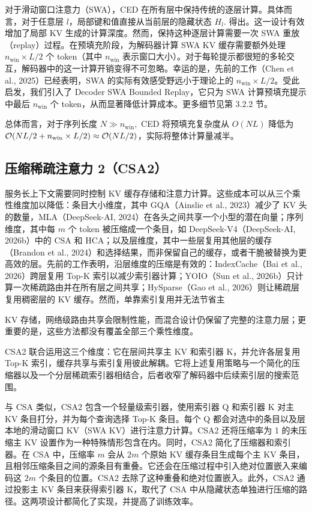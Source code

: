 \documentclass[
  10
]{article}
\begin{document}
对于滑动窗口注意力（SWA），CED 在所有层中保持传统的逐层计算。具体而言，对于任意层 $l$，局部键和值直接从当前层的隐藏状态 \(H _ { l } .\) 得出。这一设计有效增加了局部 KV 生成的计算深度。然而，保持这种逐层计算需要一次 SWA 重放（replay）过程。在预填充阶段，为解码器计算 SWA KV 缓存需要额外处理 \(n _ { \mathrm { w i n } } \times L / 2\) 个 token（其中 \(n _ { \mathrm { { w i n } } }\) 表示窗口大小）。对于每轮提示都很短的多轮交互，解码器中的这一计算开销变得不可忽略。幸运的是，先前的工作（Chen et al., 2025）已经表明，SWA 的实际有效感受野远小于理论上的 \(n _ { \mathrm { w i n } } \times L / 2\)。受此启发，我们引入了 Decoder SWA Bounded Replay，它只为 SWA 计算预填充提示中最后 \(n _ { \mathrm { w i n } }\) 个 token，从而显著降低计算成本。更多细节见第 3.2.2 节。

总体而言，对于序列长度 \(N \gg n _ { \mathrm { w i n } } ,\) CED 将预填充复杂度从 \(O ( N L )\) 降低为 \({ \cal O } ( N L / 2 + n _ { \mathrm { w i n } } \times L / 2 ) \approx { \cal O } ( N L / 2 )\)，实际将整体计算量减半。

\subsection{压缩稀疏注意力 2（CSA2）}\label{compressed-sparse-attention-2-csa2}

服务长上下文需要同时控制 KV 缓存存储和注意力计算。这些成本可以从三个乘性维度加以降低：条目大小维度，其中 GQA（Ainslie et al., 2023）减少了 KV 头的数量，MLA（DeepSeek-AI, 2024）在各头之间共享一个小型的潜在向量；序列维度，其中每 $m$ 个 token 被压缩成一个条目，如 DeepSeek-V4（DeepSeek-AI, 2026b）中的 CSA 和 HCA；以及层维度，其中一些层复用其他层的缓存（Brandon et al., 2024）和选择结果，而非保留自己的缓存，或者干脆被替换为更高效的层。先前的工作表明，沿层维度的压缩是有效的：IndexCache（Bai et al., 2026）跨层复用 Top-K 索引以减少索引器计算；YOIO（Sun et al., 2026b）只计算一次稀疏路由并在所有层之间共享；HySparse（Gao et al., 2026）则让稀疏层复用稠密层的 KV 缓存。然而，单靠索引复用并无法节省主






KV 存储，网络级路由共享会限制性能，而混合设计仍保留了完整的注意力层；更重要的是，这些方法都没有覆盖全部三个乘性维度。

CSA2 联合运用这三个维度：它在层间共享主 KV 和索引器 K，并允许各层复用 Top-K 索引，缓存共享与索引复用彼此解耦。它将上述复用策略与一个简化的压缩器以及一个分层稀疏索引器相结合，后者收窄了解码器中后续索引层的搜索范围。

与 CSA 类似，CSA2 包含一个轻量级索引器，使用索引器 Q 和索引器 K 对主 KV 条目打分，并为每个查询选择 Top-K 条目。每个 Q 都会对选中的条目以及层本地的滑动窗口 KV（SWA KV）进行注意力计算。CSA2 还将压缩率为 1 的未压缩主 KV 设置作为一种特殊情形包含在内。同时，CSA2 简化了压缩器和索引器。在 CSA 中，压缩率 $m$ 会从 $2m$ 个原始 KV 缓存条目生成每个主 KV 条目，且相邻压缩条目之间的源条目有重叠。它还会在压缩过程中引入绝对位置嵌入来编码这 $2m$ 个条目的位置。CSA2 去除了这种重叠和绝对位置嵌入。此外，CSA2 通过投影主 KV 条目来获得索引器 K，取代了 CSA 中从隐藏状态单独进行压缩的路径。这两项设计都简化了实现，并提高了训练效率。
\end{document}
